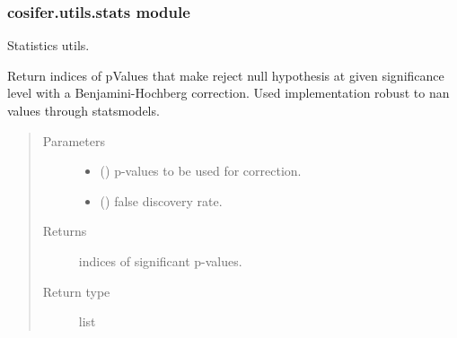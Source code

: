 \documentclass[letterpaper,10pt,english]{sphinxmanual}
\begin{document}
\subsubsection{cosifer.utils.stats module}
\label{\detokenize{_modules/cosifer.utils:module-cosifer.utils.stats}}\label{\detokenize{_modules/cosifer.utils:cosifer-utils-stats-module}}
Statistics utils.

\begin{fulllineitems}
\label{\detokenize{_modules/cosifer.utils:cosifer.utils.stats.benjamini_hochberg_correction}}
Return indices of pValues that make reject null hypothesis
at given significance level with a Benjamini-Hochberg correction.
Used implementation robust to nan values through statsmodels.
\begin{quote}\begin{description}
\item[{Parameters}] \leavevmode\begin{itemize}
\item {} 
 () \textendash{} p-values to be used for correction.

\item {} 
 () \textendash{} false discovery rate.

\end{itemize}

\item[{Returns}] \leavevmode
indices of significant p-values.

\item[{Return type}] \leavevmode
list

\end{description}\end{quote}

\end{fulllineitems}

\end{document}
